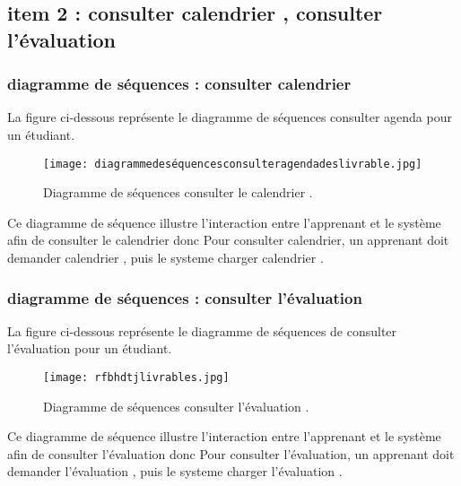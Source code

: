
\clearpage
\subsection{item 2 : consulter calendrier , consulter l'évaluation }
\subsubsection{diagramme de séquences : consulter calendrier }
La figure  ci-dessous représente le diagramme de séquences consulter agenda pour un  étudiant.

\begin{figure}[ht]
	\centering
	\texttt{[image: diagrammedeséquencesconsulteragendadeslivrable.jpg]}
	\caption{Diagramme de séquences consulter le calendrier  .}
	\label{fig:Diagramme de séquences consulter le calendrier }
\end{figure}
\FloatBarrier

Ce diagramme de séquence illustre l'interaction entre l'apprenant et le système afin de consulter le
calendrier donc  Pour consulter calendrier, un apprenant doit  demander calendrier , puis le systeme charger calendrier .

\subsubsection{diagramme de séquences : consulter l'évaluation }
La figure  ci-dessous représente le diagramme de séquences de consulter l'évaluation  pour un  étudiant.

\begin{figure}[ht]
	\centering
	\texttt{[image: rfbhdtjlivrables.jpg]}
	\caption{Diagramme de séquences consulter l'évaluation   .}
	\label{fig:Diagramme de séquences consulter l'évaluation  }
\end{figure}
\FloatBarrier

Ce diagramme de séquence illustre l'interaction entre l'apprenant et le système afin de consulter l'évaluation  donc  Pour consulter l'évaluation, un apprenant doit  demander l'évaluation , puis le systeme charger l'évaluation .



